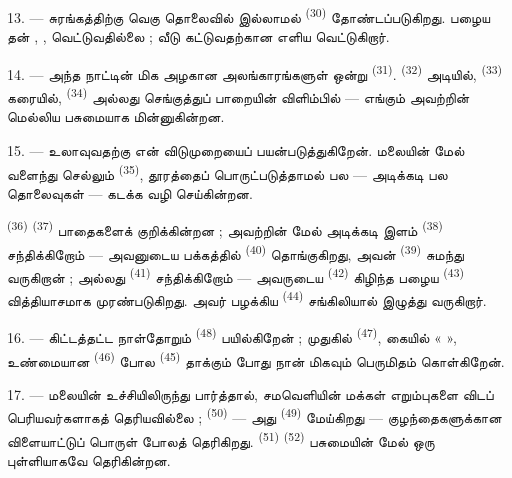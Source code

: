 13. --- சுரங்கத்திற்கு வெகு தொலைவில் இல்லாமல் 
\textsuperscript{(30)} தோண்டப்படுகிறது. பழைய 
தன்  ,
,  வெட்டுவதில்லை ;
வீடு கட்டுவதற்கான எளிய  வெட்டுகிறார்.

14. --- அந்த நாட்டின் மிக அழகான அலங்காரங்களுள் ஒன்று  \textsuperscript{(31)}. 
\textsuperscript{(32)} அடியில், 
\textsuperscript{(33)} கரையில், 
\textsuperscript{(34)} அல்லது செங்குத்துப் பாறையின் விளிம்பில் —
எங்கும் அவற்றின் மெல்லிய  பசுமையாக மின்னுகின்றன.

\VUsaut{3.0mm}
\VUsaut{3.0mm}

15. ---  உலாவுவதற்கு என் விடுமுறையைப்
பயன்படுத்துகிறேன். மலையின் மேல் வளைந்து செல்லும் 
\textsuperscript{(35)}, தூரத்தைப் பொருட்படுத்தாமல் பல
 — அடிக்கடி பல 
தொலைவுகள் — கடக்க வழி செய்கின்றன.

 \textsuperscript{(36)}  \textsuperscript{(37)} பாதைகளைக் குறிக்கின்றன ; அவற்றின் மேல்
அடிக்கடி இளம்  \textsuperscript{(38)}
சந்திக்கிறோம் — அவனுடைய பக்கத்தில் 
\textsuperscript{(40)} தொங்குகிறது, அவன் 
\textsuperscript{(39)} சுமந்து வருகிறான் ; அல்லது  \textsuperscript{(41)} சந்திக்கிறோம் — அவருடைய  \textsuperscript{(42)} கிழிந்த பழைய 
\textsuperscript{(43)} வித்தியாசமாக முரண்படுகிறது. அவர் பழக்கிய
 \textsuperscript{(44)} சங்கிலியால் இழுத்து
வருகிறார்.

\VUsaut{3.0mm}

16. --- கிட்டத்தட்ட நாள்தோறும் 
\textsuperscript{(48)}  பயில்கிறேன் ; முதுகில்
 \textsuperscript{(47)}, கையில் «  », உண்மையான 
\textsuperscript{(46)} போல  \textsuperscript{(45)}
தாக்கும் போது நான் மிகவும் பெருமிதம் கொள்கிறேன்.

17. --- மலையின் உச்சியிலிருந்து பார்த்தால், சமவெளியின் மக்கள்
எறும்புகளை விடப் பெரியவர்களாகத் தெரியவில்லை ; 
\textsuperscript{(50)} — அது 
\textsuperscript{(49)} மேய்கிறது — குழந்தைகளுக்கான விளையாட்டுப்
பொருள் போலத் தெரிகிறது.  \textsuperscript{(51)}
 \textsuperscript{(52)} பசுமையின் மேல் ஒரு
புள்ளியாகவே தெரிகின்றன.

